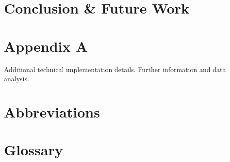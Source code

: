 \documentclass[a4paper,11pt,oneside,openany]{styles/ioniothesis}
\begin{document}
\chapter{Conclusion \& Future Work} \label{chapter:conclusion}



\chapter*{Appendix A} \pagestyle{empty}
Additional technical implementation details.
Further information and data analysis.


\begin{thebibliography}{99} 
	\pagestyle{headings}
	
\end{thebibliography}


\chapter*{Abbreviations} \pagestyle{empty}



\chapter*{Glossary} \pagestyle{empty}



\newpage
{}
\printindex
\end{document}
